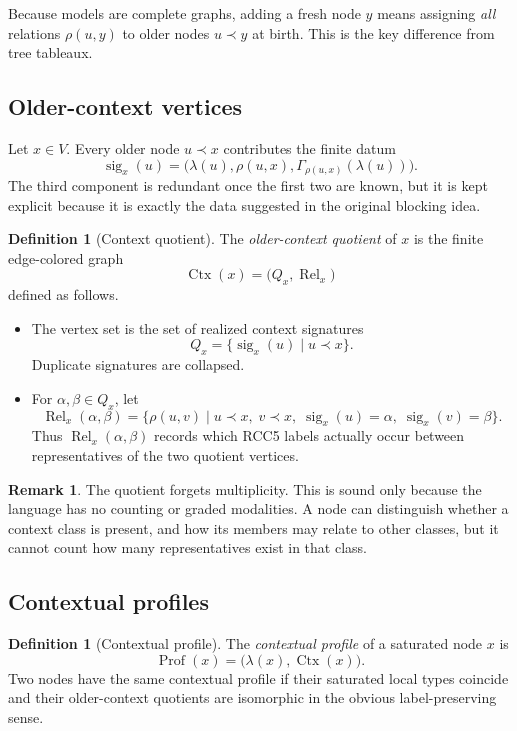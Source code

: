 \documentclass[11pt]{article}
\theoremstyle{definition}
\newtheorem{definition}[theorem]{Definition}
\newtheorem{remark}[theorem]{Remark}
\newcommand{\Prof}{\operatorname{Prof}}
\newcommand{\Ctx}{\operatorname{Ctx}}
\newcommand{\Rel}{\operatorname{Rel}}
\newcommand{\sigm}{\operatorname{sig}}
\begin{document}
Because models are complete graphs, adding a fresh node $y$ means assigning \emph{all} relations $\rho(u,y)$ to older nodes $u\prec y$ at birth. This is the key difference from tree tableaux.

\subsection{Older-context vertices}

Let $x\in V$. Every older node $u\prec x$ contributes the finite datum
\[
\sigm_x(u)=\bigl(\lambda(u),\rho(u,x),\Gamma_{\rho(u,x)}(\lambda(u))\bigr).
\]
The third component is redundant once the first two are known, but it is kept explicit because it is exactly the data suggested in the original blocking idea.

\begin{definition}[Context quotient]
The \emph{older-context quotient} of $x$ is the finite edge-colored graph
\[
\Ctx(x)=\bigl(Q_x,\Rel_x\bigr)
\]
defined as follows.
\begin{itemize}
  \item The vertex set is the set of realized context signatures
  \[
  Q_x = \{\sigm_x(u)\mid u\prec x\}.
  \]
  Duplicate signatures are collapsed.
  \item For $\alpha,\beta\in Q_x$, let
  \[
  \Rel_x(\alpha,\beta)=\{\rho(u,v)\mid u\prec x,\;v\prec x,\;\sigm_x(u)=\alpha,\;\sigm_x(v)=\beta\}.
  \]
  Thus $\Rel_x(\alpha,\beta)$ records which RCC5 labels actually occur between representatives of the two quotient vertices.
\end{itemize}
\end{definition}

\begin{remark}
The quotient forgets multiplicity. This is sound only because the language has no counting or graded modalities. A node can distinguish whether a context class is present, and how its members may relate to other classes, but it cannot count how many representatives exist in that class.
\end{remark}

\subsection{Contextual profiles}

\begin{definition}[Contextual profile]
The \emph{contextual profile} of a saturated node $x$ is
\[
\Prof(x)=\bigl(\lambda(x),\Ctx(x)\bigr).
\]
Two nodes have the same contextual profile if their saturated local types coincide and their older-context quotients are isomorphic in the obvious label-preserving sense.
\end{definition}
\end{document}
